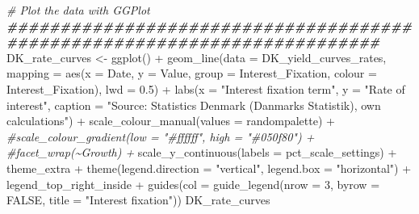 \documentclass[
]{book}
\newenvironment{Shaded}{\begin{snugshade}}{\end{snugshade}}
\newcommand{\AttributeTok}[1]{\textcolor[rgb]{0.77,0.63,0.00}{#1}}
\newcommand{\CommentTok}[1]{\textcolor[rgb]{0.56,0.35,0.01}{\textit{#1}}}
\newcommand{\ConstantTok}[1]{\textcolor[rgb]{0.00,0.00,0.00}{#1}}
\newcommand{\DecValTok}[1]{\textcolor[rgb]{0.00,0.00,0.81}{#1}}
\newcommand{\DocumentationTok}[1]{\textcolor[rgb]{0.56,0.35,0.01}{\textbf{\textit{#1}}}}
\newcommand{\FloatTok}[1]{\textcolor[rgb]{0.00,0.00,0.81}{#1}}
\newcommand{\FunctionTok}[1]{\textcolor[rgb]{0.00,0.00,0.00}{#1}}
\newcommand{\NormalTok}[1]{#1}
\newcommand{\OtherTok}[1]{\textcolor[rgb]{0.56,0.35,0.01}{#1}}
\newcommand{\SpecialCharTok}[1]{\textcolor[rgb]{0.00,0.00,0.00}{#1}}
\newcommand{\StringTok}[1]{\textcolor[rgb]{0.31,0.60,0.02}{#1}}
\begin{document}
\begin{Shaded}
\begin{Highlighting}[]
\CommentTok{\# Plot the data with GGPlot}
\DocumentationTok{\#\#\#\#\#\#\#\#\#\#\#\#\#\#\#\#\#\#\#\#\#\#\#\#\#\#\#\#\#\#\#\#\#\#\#\#\#\#\#\#\#\#\#\#\#\#\#\#\#\#\#\#\#\#\#\#\#\#\#\#\#\#\#\#\#\#\#\#\#\#\#\#\#}
\NormalTok{DK\_rate\_curves }\OtherTok{\textless{}{-}} \FunctionTok{ggplot}\NormalTok{() }\SpecialCharTok{+}
    \FunctionTok{geom\_line}\NormalTok{(}\AttributeTok{data =}\NormalTok{ DK\_yield\_curves\_rates,}
              \AttributeTok{mapping =} \FunctionTok{aes}\NormalTok{(}\AttributeTok{x =}\NormalTok{ Date,}
                            \AttributeTok{y =}\NormalTok{ Value,}
                            \AttributeTok{group =}\NormalTok{ Interest\_Fixation,}
                            \AttributeTok{colour =}\NormalTok{ Interest\_Fixation),}
              \AttributeTok{lwd =} \FloatTok{0.5}\NormalTok{) }\SpecialCharTok{+}
    \FunctionTok{labs}\NormalTok{(}\AttributeTok{x =} \StringTok{"Interest fixation term"}\NormalTok{, }\AttributeTok{y =} \StringTok{"Rate of interest"}\NormalTok{,}
         \AttributeTok{caption =} \StringTok{"Source: Statistics Denmark (Danmarks Statistik), own calculations"}\NormalTok{) }\SpecialCharTok{+}
    \FunctionTok{scale\_colour\_manual}\NormalTok{(}\AttributeTok{values =}\NormalTok{ randompalette) }\SpecialCharTok{+}
    \CommentTok{\#scale\_colour\_gradient(low = "\#ffffff", high = "\#050f80") +}
    \CommentTok{\#facet\_wrap(\textasciitilde{}Growth) +}
    \FunctionTok{scale\_y\_continuous}\NormalTok{(}\AttributeTok{labels =}\NormalTok{ pct\_scale\_settings) }\SpecialCharTok{+}
\NormalTok{    theme\_extra }\SpecialCharTok{+}
    \FunctionTok{theme}\NormalTok{(}\AttributeTok{legend.direction =} \StringTok{"vertical"}\NormalTok{,}
          \AttributeTok{legend.box =} \StringTok{"horizontal"}\NormalTok{) }\SpecialCharTok{+}
\NormalTok{    legend\_top\_right\_inside }\SpecialCharTok{+}
    \FunctionTok{guides}\NormalTok{(}\AttributeTok{col =} \FunctionTok{guide\_legend}\NormalTok{(}\AttributeTok{nrow =} \DecValTok{3}\NormalTok{, }
                              \AttributeTok{byrow =} \ConstantTok{FALSE}\NormalTok{,}
                              \AttributeTok{title =} \StringTok{"Interest fixation"}\NormalTok{))}
\NormalTok{DK\_rate\_curves}
\end{Highlighting}
\end{Shaded}
\end{document}
